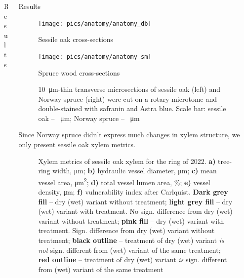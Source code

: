 \documentclass[final]{beamer}
\newlength{\sepwidth}
\newlength{\colwidth}
\newcommand{\separatorcolumn}{\begin{column}{\sepwidth}\end{column}}
\begin{document}
\begin{frame}[t]
\begin{columns}[t]
\begin{column}{\colwidth}
\begin{block}{Results}
   \begin{figure}
       \caption{}
       \label{fig:sap}
   \end{figure}
\end{block}

\end{column}


\begin{column}{\colwidth}

\begin{block}{Results}
    \begin{figure}
        \begin{minipage}{0.45\textwidth}
            \centering \texttt{[image: pics/anatomy/anatomy\_db]}
            \caption*{Sessile oak cross-sections}
            \label{fig:anatomy_db}
        \end{minipage}\hfill
        \begin{minipage}{0.45\textwidth}
            \centering \texttt{[image: pics/anatomy/anatomy\_sm]}
            \caption*{Spruce wood cross-sections}
            \label{fig:anatomy_sm}
        \end{minipage}\hfill
        \caption{\SI{10}{\micro\meter}-thin transverse microsections of sessile oak (left) and Norway spruce (right) were cut on a rotary microtome and double-stained with safranin and Astra blue. Scale bar: sessile oak -- \SI{}{\micro\meter}; Norway spruce -- \SI{}{\micro\meter}}
    \end{figure}
Since Norway spruce didn't express much changes in xylem structure, we only present sessile oak xylem metrics.
    \begin{figure}
        
        \caption{
            Xylem metrics of sessile oak xylem for the ring of 2022. 
            \textbf{a)} tree-ring width, \si{\micro\meter};
            \textbf{b)} hydraulic vessel diameter, \si{\micro\meter};
            \textbf{c)} mean vessel area, \si{\micro\meter\squared};
            \textbf{d)} total vessel lumen area, \%;
            \textbf{e)} vessel density, \si{\micro\meter};
            \textbf{f)} vulnerability index after Carlquist.
            \textbf{Dark grey fill} -- dry (wet) variant without treatment; \textbf{light grey fill} -- dry (wet) variant with treatment. No sign. difference from dry (wet) variant without treatment; \textbf{pink fill} -- dry (wet) variant with treatment. Sign. difference from dry (wet) variant without treatment; \textbf{black outline} -- treatment of dry (wet) variant \emph{is not} sign. different from (wet) variant of the same treatment; \textbf{red outline} -- treatment of dry (wet) variant \emph{is} sign. different from (wet) variant of the same treatment
        }
        \label{fig:xmg}
    \end{figure}
\end{block}
\end{column}
\end{columns}


\end{frame}
\end{document}
